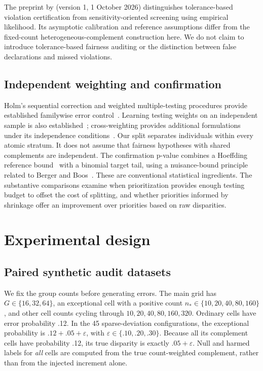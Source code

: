 \documentclass[Afour,sageh,times,doublespace]{sagej}
\begin{document}
The preprint by \citet{tang2026tolerance} (version 1, 1 October 2026) distinguishes tolerance-based violation certification from sensitivity-oriented screening using empirical likelihood. Its asymptotic calibration and reference assumptions differ from the fixed-count heterogeneous-complement construction here. We do not claim to introduce tolerance-based fairness auditing or the distinction between false declarations and missed violations.

\subsection{Independent weighting and confirmation}
Holm's sequential correction and weighted multiple-testing procedures provide established familywise error control~\citep{holm1979simple,kang2009weighted}. Learning testing weights on an independent sample is also established~\citep{rubin2006splitting}; cross-weighting provides additional formulations under its independence conditions~\citep{ignatiadis2021covariate}. Our split separates individuals within every atomic stratum. It does not assume that fairness hypotheses with shared complements are independent. The confirmation p-value combines a Hoeffding reference bound~\citep{hoeffding1963probability} with a binomial target tail, using a nuisance-bound principle related to Berger and Boos~\citep{berger1994pvalues}. These are conventional statistical ingredients. The substantive comparisons examine when prioritization provides enough testing budget to offset the cost of splitting, and whether priorities informed by shrinkage offer an improvement over priorities based on raw disparities.



\section{Experimental design}\label{sec:experiments}
\subsection{Paired synthetic audit datasets}
We fix the group counts before generating errors. The main grid has $G\in\{16,32,64\}$, an exceptional cell with a positive count $n_*\in\{10,20,40,80,160\}$, and other cell counts cycling through $10,20,40,80,160,320$. Ordinary cells have error probability .12. In the 45 sparse-deviation configurations, the exceptional probability is $.12+.05+\varepsilon$, with $\varepsilon\in\{.10,.20,.30\}$. Because all its complement cells have probability .12, its true disparity is exactly $.05+\varepsilon$. Null and harmed labels for \emph{all} cells are computed from the true count-weighted complement, rather than from the injected increment alone.
\end{document}
